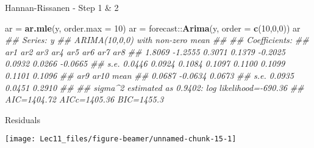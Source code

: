 \documentclass[11pt,ignorenonframetext,]{beamer}
\newenvironment{Shaded}{}{}
\newcommand{\CommentTok}[1]{\textcolor[rgb]{0.38,0.63,0.69}{\textit{#1}}}
\newcommand{\DataTypeTok}[1]{\textcolor[rgb]{0.56,0.13,0.00}{#1}}
\newcommand{\DecValTok}[1]{\textcolor[rgb]{0.25,0.63,0.44}{#1}}
\newcommand{\KeywordTok}[1]{\textcolor[rgb]{0.00,0.44,0.13}{\textbf{#1}}}
\newcommand{\NormalTok}[1]{#1}
\newcommand{\OperatorTok}[1]{\textcolor[rgb]{0.40,0.40,0.40}{#1}}
\newcommand{\StringTok}[1]{\textcolor[rgb]{0.25,0.44,0.63}{#1}}
\let\oldShaded\Shaded
\let\endoldShaded\endShaded
\renewenvironment{Shaded}{\footnotesize\begin{spacing}{0.9}\oldShaded}{\endoldShaded\end{spacing}}
\let\oldverbatim\verbatim
\let\endoldverbatim\endverbatim
\newcommand{\scriptoutput}{
  \renewenvironment{Shaded}{\scriptsize\begin{spacing}{0.9}\oldShaded}{\endoldShaded\end{spacing}}
  \renewenvironment{verbatim}{\scriptsize\begin{spacing}{0.9}\oldverbatim}{\endoldverbatim\end{spacing}}
}
\begin{document}
\begin{frame}[fragile,t]{Hannan-Rissanen - Step 1 \& 2}
\protect\hypertarget{hannan-rissanen---step-1-2}{}

\scriptoutput

\begin{Shaded}
\begin{Highlighting}[]
\NormalTok{ar =}\StringTok{ }\KeywordTok{ar.mle}\NormalTok{(y, }\DataTypeTok{order.max =} \DecValTok{10}\NormalTok{)}
\NormalTok{ar =}\StringTok{ }\NormalTok{forecast}\OperatorTok{::}\KeywordTok{Arima}\NormalTok{(y, }\DataTypeTok{order =} \KeywordTok{c}\NormalTok{(}\DecValTok{10}\NormalTok{,}\DecValTok{0}\NormalTok{,}\DecValTok{0}\NormalTok{))}
\NormalTok{ar}
\CommentTok{## Series: y }
\CommentTok{## ARIMA(10,0,0) with non-zero mean }
\CommentTok{## }
\CommentTok{## Coefficients:}
\CommentTok{##          ar1      ar2     ar3     ar4      ar5     ar6     ar7      ar8}
\CommentTok{##       1.8069  -1.2555  0.3071  0.1379  -0.2025  0.0932  0.0266  -0.0665}
\CommentTok{## s.e.  0.0446   0.0924  0.1084  0.1097   0.1100  0.1099  0.1101   0.1096}
\CommentTok{##          ar9     ar10    mean}
\CommentTok{##       0.0687  -0.0634  0.0673}
\CommentTok{## s.e.  0.0935   0.0451  0.2910}
\CommentTok{## }
\CommentTok{## sigma^2 estimated as 0.9402:  log likelihood=-690.36}
\CommentTok{## AIC=1404.72   AICc=1405.36   BIC=1455.3}
\end{Highlighting}
\end{Shaded}

\end{frame}

\begin{frame}[fragile]{Residuals}
\protect\hypertarget{residuals}{}

\begin{Shaded}
\end{Shaded}

\begin{center}\texttt{[image: Lec11\_files/figure-beamer/unnamed-chunk-15-1]} \end{center}

\end{frame}
\end{document}
